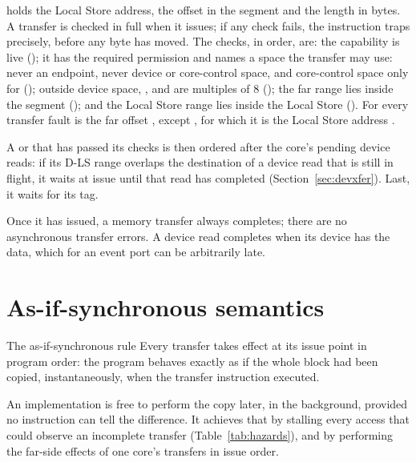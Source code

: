  holds the Local Store address,  the offset in the segment and  the length in
bytes. A transfer is checked in full when it issues; if any check fails, the instruction traps
precisely, before any byte has moved. The checks, in order, are: the capability is live
(); it has the required permission and names a space the transfer may use: never an
endpoint,  never device or core-control space, and core-control space only for 
(); outside device space, ,  and  are multiples of 8
(); the far range lies inside the segment (); and the Local Store range lies
inside the Local Store (). For every transfer fault  is the far offset
, except , for which it is the Local Store address .

A  or  that has passed its checks is then ordered after the core's pending
device reads: if its D-LS range overlaps the destination of a device read that is still in flight, it
waits at issue until that read has completed (Section~\ref{sec:devxfer}). Last, it waits for its tag.

Once it has issued, a memory transfer always completes; there are no asynchronous transfer errors. A
device read completes when its device has the data, which for an event port can be arbitrarily late.

\section{As-if-synchronous semantics}\label{sec:asif}

\begin{rule*}{The as-if-synchronous rule}
Every transfer takes effect at its issue point in program order: the program behaves exactly as if
the whole block had been copied, instantaneously, when the transfer instruction executed.
\end{rule*}

An implementation is free to perform the copy later, in the background, provided no instruction can
tell the difference. It achieves that by stalling every access that could observe an incomplete
transfer (Table~\ref{tab:hazards}), and by performing the far-side effects of one core's transfers in
issue order.

